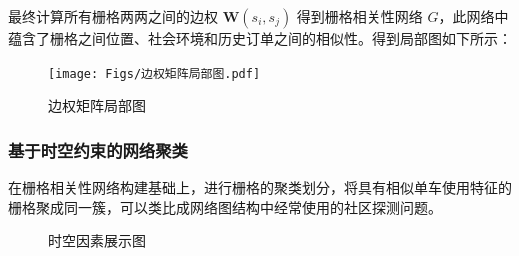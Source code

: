 \documentclass[12pt,a4paper,oneside]{ctexart}
\begin{document}
最终计算所有栅格两两之间的边权 $\boldsymbol{W}(s_i, s_j)$ 得到栅格相关性网络 $G$，此网络中蕴含了栅格之间位置、社会环境和历史订单之间的相似性。得到局部图如下所示：
\begin{figure}[H]
    \centering
    \texttt{[image: Figs/边权矩阵局部图.pdf]}
    \caption{边权矩阵局部图}
    \label{fig:weightmart}
\end{figure}

\subsubsection{基于时空约束的网络聚类}

在栅格相关性网络构建基础上，进行栅格的聚类划分，将具有相似单车使用特征的栅格聚成同一簇，可以类比成网络图结构中经常使用的社区探测问题。
\begin{figure}[H]
    \centering
    \caption{时空因素展示图}
    \label{fig:时空因素展示图}
\end{figure}


\end{document}
